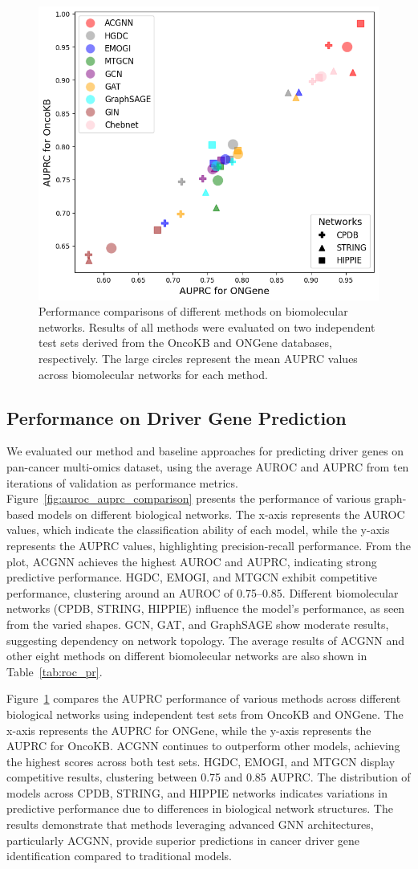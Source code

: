 \begin{figure}[ht]
	\centering
		\scriptsize
	\captionsetup{font=footnotesize}
	\includegraphics[width=0.45 \textwidth]{images/__comp_oncokb_ongene_acgnn.png}
	\caption{Performance comparisons of different methods on biomolecular networks. Results of all methods were evaluated on two independent test sets derived from the OncoKB and ONGene databases, respectively. The large circles represent the mean AUPRC values across biomolecular networks for each method.}
	\label{fig11}
\end{figure}



\subsection{Performance on Driver Gene Prediction}
We evaluated our method and baseline approaches for predicting driver genes on pan-cancer multi-omics dataset, using the average AUROC and AUPRC from ten iterations of validation as performance metrics. 
Figure~\ref{fig:auroc_auprc_comparison} presents the performance of various graph-based models on different biological networks. The x-axis represents the AUROC values, which indicate the classification ability of each model, while the y-axis represents the AUPRC values, highlighting precision-recall performance.
From the plot, ACGNN achieves the highest AUROC and AUPRC, indicating strong predictive performance. HGDC, EMOGI, and MTGCN exhibit competitive performance, clustering around an AUROC of 0.75–0.85. Different biomolecular networks (CPDB, STRING, HIPPIE) influence the model's performance, as seen from the varied shapes. GCN, GAT, and GraphSAGE show moderate results, suggesting dependency on network topology. 
The average results of ACGNN  and other eight methods on different biomolecular networks are also shown in Table~\ref{tab:roc_pr}. 

 Figure~\ref{fig11} compares the AUPRC performance of various methods across different biological networks using independent test sets from OncoKB and ONGene. The x-axis represents the AUPRC for ONGene, while the y-axis represents the AUPRC for OncoKB. 
ACGNN continues to outperform other models, achieving the highest scores across both test sets. HGDC, EMOGI, and MTGCN display competitive results, clustering between 0.75 and 0.85 AUPRC. The distribution of models across CPDB, STRING, and HIPPIE networks indicates variations in predictive performance due to differences in biological network structures.
The results demonstrate that methods leveraging advanced GNN architectures, particularly ACGNN, provide superior predictions in cancer driver gene identification compared to traditional models.


